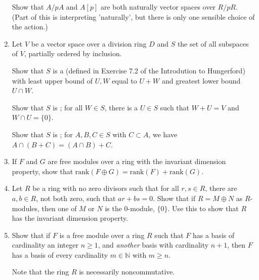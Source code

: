 \documentclass[12pt]{article}
\newcommand{\NN}{{\mathbb N}}
\newcommand{\rank}{\mbox{rank}}
\def\demph#1{{\color{blue}{\sl #1}}}
\begin{document}
\begin{enumerate}
   Show that $A/pA$ and $A[p]$ are both  naturally vector spaces over $R/pR$.
   (Part of this is interpreting 'naturally', but there is only one sensible choice of the action.)
   \vspace{-2pt}

 \item Let $V$ be a vector space over a division ring $D$ and $S$ the set of all subspaces of $V$, partially ordered by inclusion.

   Show that $S$ is a \demph{complete lattice} (defined in Exercise 7.2 of the Introdution to Hungerford) with least upper bound of $U,W$
   equal to $U+W$ and greatest lower bound $U\cap W$.

   Show that $S$ is \demph{complemented}; for all $W\in S$, there is a $U\in S$ such that $W+U=V$ and $W\cap U=\{0\}$.

   Show that $S$ is \demph{modular}; for $A,B,C\in S$ with $C\subset A$, we have $A\cap(B+C)=(A\cap B)+C$.
   \vspace{-2pt}


 \item If $F$ and $G$ are free modules over a ring with the invariant dimension property, show that\newline 
   $\rank(F\oplus G)=\rank(F)+ \rank(G)$.
   \vspace{-2pt}

 \item Let $R$ be a ring with no zero divisors such that for all $r,s\in R$, there are $a,b\in R$, not both zero, such that $ar+bs=0$.
   Show that if $R=M\oplus N$ as $R$-modules, then one of $M$ or $N$ is the 0-module, $\{0\}$.
   Use this to show that $R$ has the invariant dimension property. 
   \vspace{-2pt}

 \item Show that if $F$ is a free module over a ring $R$ such that $F$ has a basis of cardinality an integer
   $n\geq 1$, and {\sl another} basis  with cardinality $n{+}1$, then $F$ has a basis of every cardinality $m\in \NN$ with $m\geq n$.

   Note that the ring $R$ is necessarily noncommutative.
   \vspace{-2pt}

\end{enumerate}
\end{document}
